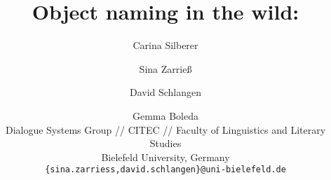 \documentclass[11pt]{article}
\title{Object naming in the wild: \gbt{add sthg make more concrete}}
\author{Carina Silberer \and Sina Zarrie{\ss}  \and David Schlangen \and Gemma Boleda\\
  Dialogue Systems Group // CITEC // Faculty of Linguistics and Literary Studies \\
 Bielefeld University, Germany \\
  {\tt \{sina.zarriess,david.schlangen\}@uni-bielefeld.de} \\}
\date{}
\begin{document}
\maketitle

\begin{abstract}
\end{abstract}





%




\end{document}
